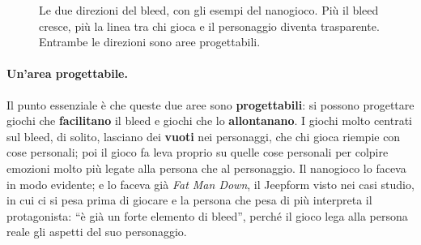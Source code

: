 \begin{figure}[htbp]
\centering
{}
\caption{Le due direzioni del bleed, con gli esempi del nanogioco. Più il bleed
cresce, più la linea tra chi gioca e il personaggio diventa trasparente. Entrambe
le direzioni sono aree progettabili.}
\label{a5:fig:bleed}
\end{figure}

\paragraph{Un'area progettabile.} Il punto essenziale è che queste due aree sono
\textbf{progettabili}: si possono progettare giochi che \textbf{facilitano} il bleed
e giochi che lo \textbf{allontanano}. I giochi molto centrati sul bleed, di solito,
lasciano dei \textbf{vuoti} nei personaggi, che chi gioca riempie con cose personali;
poi il gioco fa leva proprio su quelle cose personali per colpire emozioni molto più
legate alla persona che al personaggio. Il nanogioco lo faceva in modo evidente; e
lo faceva già \emph{Fat Man Down}, il Jeepform visto nei casi studio, in cui ci si
pesa prima di giocare e la persona che pesa di più interpreta il protagonista: ``è
già un forte elemento di bleed'', perché il gioco lega alla persona reale gli
aspetti del suo personaggio.

